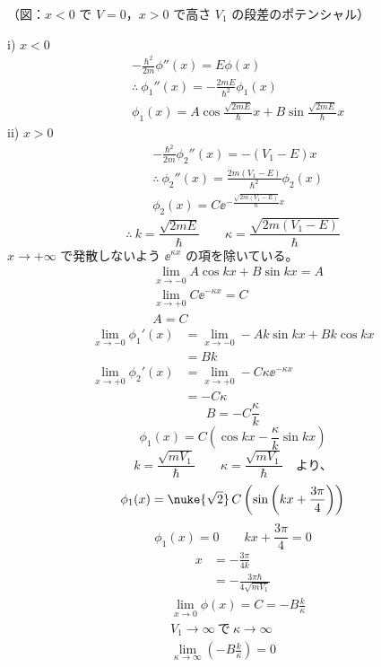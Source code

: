 （図：$x<0$ で $V=0$，$x>0$ で高さ $V_{1}$ の段差のポテンシャル）

i) $x<0$
\begin{align*}
&-\frac{\hbar^{2}}{2m}\phi''(x)=E\phi(x)\\
&\therefore\ \phi_{1}''(x)=-\frac{2mE}{\hbar^{2}}\phi_{1}(x)\\
&\phi_{1}(x)=A\cos\frac{\sqrt{2mE}}{\hbar}x+B\sin\frac{\sqrt{2mE}}{\hbar}x
\end{align*}
ii) $x>0$
\begin{align*}
&-\frac{\hbar^{2}}{2m}\phi_{2}''(x)=-(V_{1}-E)x\\
&\therefore\ \phi_{2}''(x)=\frac{2m(V_{1}-E)}{\hbar^{2}}\phi_{2}(x)\\
&\phi_{2}(x)=C\ee^{-\frac{\sqrt{2m(V_{1}-E)}}{\hbar}x}
\end{align*}
\[ \therefore\ k=\frac{\sqrt{2mE}}{\hbar}\qquad\kappa=\frac{\sqrt{2m(V_{1}-E)}}{\hbar} \]
$x\to+\infty$ で発散しないよう $\ee^{\kappa x}$ の項を除いている。
\begin{align*}
&\lim_{x\to-0}A\cos kx+B\sin kx=A\\
&\lim_{x\to+0}C\ee^{-\kappa x}=C\\
&A=C
\end{align*}
\begin{align*}
\lim_{x\to-0}\phi_{1}'(x)&=\lim_{x\to-0}-Ak\sin kx+Bk\cos kx\\
&=Bk\\
\lim_{x\to+0}\phi_{2}'(x)&=\lim_{x\to+0}-C\kappa\ee^{-\kappa x}\\
&=-C\kappa
\end{align*}
\[ B=-C\frac{\kappa}{k} \]
\[ \phi_{1}(x)=C\left(\cos kx-\frac{\kappa}{k}\sin kx\right) \]
\[ k=\frac{\sqrt{mV_{1}}}{\hbar}\qquad\kappa=\frac{\sqrt{mV_{1}}}{\hbar}\quad\text{より、} \]
\[ \phi_{1}(x)=\nuke{\sqrt{2}}\,C\left(\sin\left(kx+\frac{3\pi}{4}\right)\right) \]
\[ \phi_{1}(x)=0\qquad kx+\frac{3\pi}{4}=0 \]
\begin{align*}
x&=-\frac{3\pi}{4k}\\
&=-\frac{3\pi\hbar}{4\sqrt{mV_{1}}}
\end{align*}
\begin{align*}
&\lim_{x\to0}\phi(x)=C=-B\frac{k}{\kappa}\\
&V_{1}\to\infty\ \text{で}\ \kappa\to\infty\\
&\lim_{\kappa\to\infty}\left(-B\frac{k}{\kappa}\right)=0
\end{align*}
